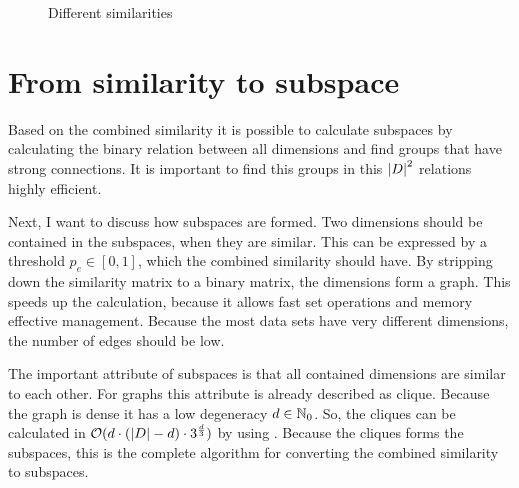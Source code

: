 \begin{figure}
	\centering
	
	\caption{Different similarities}
	\label{fig:similarities}
\end{figure}

\section{From similarity to subspace}
Based on the combined similarity it is possible to calculate subspaces by calculating the binary relation between all dimensions and find groups that have strong connections. It is important to find this groups in this $\left|D\right|^2$ relations highly efficient.

Next, I want to discuss how subspaces are formed. Two dimensions should be contained in the subspaces, when they are similar. This can be expressed by a threshold $p_e \in [0,1]$, which the combined similarity should have. By stripping down the similarity matrix to a binary matrix, the dimensions form a graph. This speeds up the calculation, because it allows fast set operations and memory effective management. Because the most data sets have very different dimensions, the number of edges should be low.

The important attribute of subspaces is that all contained dimensions are similar to each other. For graphs this attribute is already described as clique. Because the graph is dense it has a low degeneracy $d \in \mathbb{N}_0$. So, the cliques can be calculated in $\mathcal{O}(d \cdot (\left|D\right| - d) \cdot 3^{\frac{d}{3}})$ by using \cite{listingCliques}. Because the cliques forms the subspaces, this is the complete algorithm for converting the combined similarity to subspaces.

